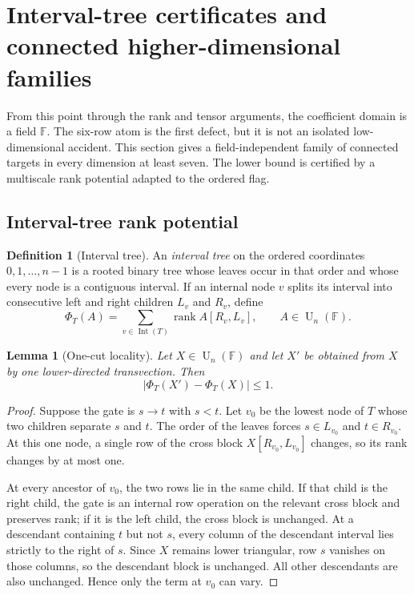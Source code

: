 \documentclass[11pt]{amsart}
\numberwithin{equation}{section}
\newtheorem{lemma}[theorem]{Lemma}
\theoremstyle{definition}
\newtheorem{definition}[theorem]{Definition}
\theoremstyle{remark}
\newcommand{\F}{\mathbb F}
\newcommand{\U}{\operatorname{U}}
\newcommand{\rank}{\operatorname{rank}}
\begin{document}
\section{Interval-tree certificates and connected higher-dimensional families}\label{sec:higher}

From this point through the rank and tensor arguments, the coefficient domain is a field $\F$.  The six-row atom is the first defect, but it is not an isolated low-dimensional accident.  This section gives a field-independent family of connected targets in every dimension at least seven.  The lower bound is certified by a multiscale rank potential adapted to the ordered flag.

\subsection{Interval-tree rank potential}

\begin{definition}[Interval tree]
An \emph{interval tree} on the ordered coordinates $0,1,\ldots,n-1$ is a rooted binary tree whose leaves occur in that order and whose every node is a contiguous interval.  If an internal node $v$ splits its interval into consecutive left and right children $L_v$ and $R_v$, define
\begin{equation}\label{eq:tree-potential}
\Phi_T(A)
=
\sum_{v\in\operatorname{Int}(T)}
\rank A[R_v,L_v],
\qquad A\in\U_n(\F).
\end{equation}
\end{definition}

\begin{lemma}[One-cut locality]\label{lem:one-cut-locality}
Let $X\in\U_n(\F)$ and let $X'$ be obtained from $X$ by one lower-directed transvection.  Then
\[
\bigl|\Phi_T(X')-\Phi_T(X)\bigr|\le1.
\]
\end{lemma}

\begin{proof}
Suppose the gate is $s\to t$ with $s<t$.  Let $v_0$ be the lowest node of $T$ whose two children separate $s$ and $t$.  The order of the leaves forces $s\in L_{v_0}$ and $t\in R_{v_0}$.  At this one node, a single row of the cross block $X[R_{v_0},L_{v_0}]$ changes, so its rank changes by at most one.

At every ancestor of $v_0$, the two rows lie in the same child.  If that child is the right child, the gate is an internal row operation on the relevant cross block and preserves rank; if it is the left child, the cross block is unchanged.  At a descendant containing $t$ but not $s$, every column of the descendant interval lies strictly to the right of $s$.  Since $X$ remains lower triangular, row $s$ vanishes on those columns, so the descendant block is unchanged.  All other descendants are also unchanged.  Hence only the term at $v_0$ can vary.
\end{proof}
\end{document}
